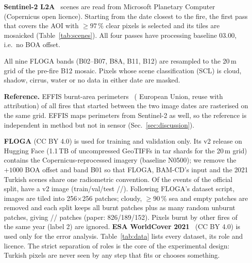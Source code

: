 \textbf{Sentinel-2 L2A}~\cite{drusch2012sentinel2} scenes are read from Microsoft Planetary
Computer~\cite{planetarycomputer2022} (Copernicus open licence). Starting from the date closest to the fire, the
first pass that covers the AOI with $\geq97\,\%$ clear pixels is selected and its tiles are mosaicked
(Table~\ref{tab:scenes}). All four passes have processing baseline 03.00, i.e.\ no BOA offset.

\begin{table}[t]
\centering
\caption{Sentinel-2 L2A passes of the Turkish test set (same relative orbit before and after each fire).}\label{tab:scenes}
\resizebox{\columnwidth}{!}{}
\end{table}
All nine FLOGA bands (B02--B07, B8A, B11, B12) are resampled to the 20\,m grid of the pre-fire B12 mosaic.
Pixels whose scene classification (SCL) is cloud, shadow, cirrus, water or no data in either date are masked.

\textbf{Reference.} EFFIS burnt-area perimeters~\cite{sanmiguel2012effis} (\textcopyright{} European Union, reuse with attribution)
of all fires that started between the two image dates are rasterised on the same grid. EFFIS maps perimeters from
Sentinel-2 as well, so the reference is independent in method but not in sensor (Sec.~\ref{sec:discussion}).

\textbf{FLOGA} (CC BY 4.0) is used for training and validation only. Its v2 release on Hugging Face (1.1\,TB of
uncompressed GeoTIFFs in tar shards for the 20\,m grid) contains the Copernicus-reprocessed imagery (baseline N0500);
we remove the $+1000$ BOA offset and band B01 so that FLOGA, BAM-CD's input and the 2021 Turkish scenes share one
radiometric convention. Of the \EventsSplit{} events of the official split, \EventsMapped{} have a v2 image
(train/val/test \EventsTrain/\EventsVal/\EventsTest). Following FLOGA's dataset script, images are tiled into
256$\times$256 patches; cloudy, $\geq$90\,\% sea and empty patches are removed and each split keeps all burnt
patches plus as many random unburnt patches, giving \PatchesTrain/\PatchesVal/\PatchesTest{} patches
(paper: 826/189/152). Pixels burnt by other fires of the same year (label 2) are ignored.
\textbf{ESA WorldCover 2021}~\cite{zanaga2022worldcover} (CC BY 4.0) is used only for the error analysis.
Table~\ref{tab:data} lists every dataset, its role and licence. The strict separation of roles is the core of
the experimental design: Turkish pixels are never seen by any step that fits or chooses something.

